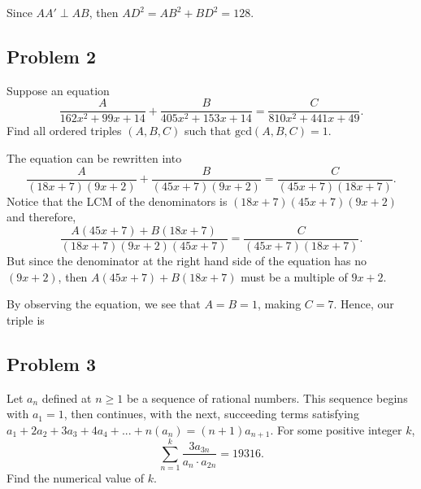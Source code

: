 \documentclass[11pt,paper=letter]{scrartcl}
\begin{document}
\begin{center}
\end{center}

Since $AA' \perp AB$, then $AD^2 = AB^2 + BD^2 = 128.$


\subsection{Problem 2}

\vspace{2mm}



\begin{mdframed}[style=jremmdbox, frametitle = Problem 2]
Suppose an equation $$\dfrac{A}{162x^2 +99x + 14} + \dfrac{B}{405x^2 +153x + 14} = \dfrac{C}{810x^2 +441x + 49}.$$ Find all ordered triples $(A,B,C)$ such that $\text{gcd}(A, B, C)=1$. 
\end{mdframed}


\sol The equation can be rewritten into $$\dfrac{A}{(18x +7)(9x+2)} + \dfrac{B}{(45x+7)(9x+2)} = \dfrac{C}{(45x +7)(18x+7)}.$$ Notice that the LCM of the denominators is $(18x+7)(45x+7)(9x+2)$ and therefore, $$\dfrac{A(45x+7) + B(18x+7)}{(18x +7)(9x+2)(45x+7)}  = \dfrac{C}{(45x +7)(18x+7)}.$$ But since the denominator at the right hand side of the equation has no $(9x +2)$, then $A(45x+7) + B(18x+7)$ must be a multiple of $9x+2$. 

By observing the equation, we see that $A=B=1$, making $C = 7$. Hence, our triple is 

\newpage

\subsection{Problem 3}

\vspace{2mm}



\begin{mdframed}[style=jremmdbox, frametitle = Problem 3]
Let ${a_n}$ defined at $n \geq 1$ be a sequence of rational numbers. This sequence begins with $a_1= 1$, then continues, with the next, succeeding terms satisfying $a_1 + 2a_2 + 3a_3 + 4a_4 + ... + n(a_n) = (n + 1)a_{n + 1}$. For some positive integer $k$, $$ \sum_{n=1}^{k} \dfrac{3a_{3n}}{a_n \cdot a_{2n}} = 19316.$$ Find the numerical value of $k$.
\end{mdframed}
\end{document}
